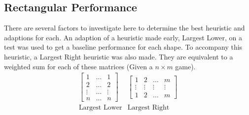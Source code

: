 \documentclass{article}
\begin{document}
\subsection{Rectangular Performance}
There are several factors to investigate here to determine the best heuristic and adaptions for each. An adaption of a heuristic made early, Largest Lower, on a test was used to get a baseline performance for each shape. To accompany this heuristic, a Largest Right heuristic was also made. They are equivalent to a weighted sum for each of these matrices (Given a $n \times m$ game).
$$
\begin{matrix}
    \begin{bmatrix}
        1 & \hdots & 1 \\
        2 & \hdots & 2 \\
        \vdots & \hdots & \vdots \\
        n & \hdots & n
    \end{bmatrix}
    &
        \begin{bmatrix}
        1 & 2 & \hdots & m\\
        \vdots & \vdots & \vdots  &\vdots\\
        1 & 2 & \hdots & m
    \end{bmatrix}
    \\
    \text{Largest Lower}&\text{Largest Right}
\end{matrix}
$$
\end{document}

